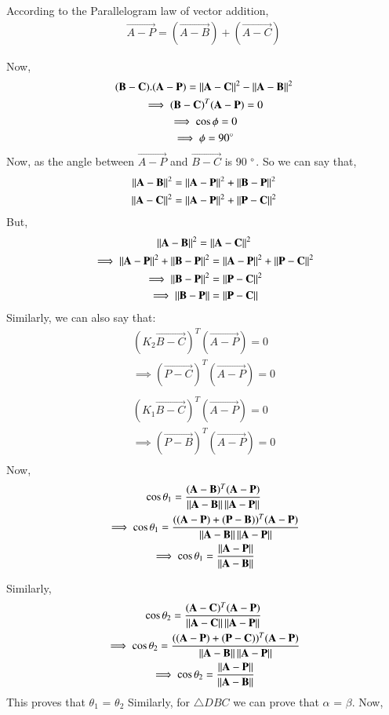 \documentclass[journal,12pt,twocolumn]{IEEEtran}
\begin{document}
According to the Parallelogram law of vector addition,
\begin{align}
\vec{A-P} = (\vec{A-B}) + (\vec{A-C})
\end{align}

Now, 
\begin{multline}
(\mathbf{B-C}). (\mathbf{A-P}) = \left\lVert\mathbf{A-C}\right\rVert^2 - \left\lVert\mathbf{A-B}\right\rVert^2\\
\implies (\mathbf{B-C})^T (\mathbf{A-P}) = 0\\
\implies \cos\phi = 0\\
\implies \phi = 90 \degree
\end{multline}
Now, as the angle between $\vec{A-P}$ and $\vec{B-C}$ is 90 $\degree$. So we can say that,
\begin{multline}
\left\lVert\mathbf{A-B}\right\rVert^2 = \left\lVert\mathbf{A-P}\right\rVert^2 + \left\lVert\mathbf{B-P}\right\rVert^2\\
\left\lVert\mathbf{A-C}\right\rVert^2 = \left\lVert\mathbf{A-P}\right\rVert^2 + \left\lVert\mathbf{P-C}\right\rVert^2\\
\end{multline}
But,
\begin{multline}
\left\lVert\mathbf{A-B}\right\rVert^2 = \left\lVert\mathbf{A-C}\right\rVert^2\\
\implies \left\lVert\mathbf{A-P}\right\rVert^2 + \left\lVert\mathbf{B-P}\right\rVert^2 = \left\lVert\mathbf{A-P}\right\rVert^2 + \left\lVert\mathbf{P-C}\right\rVert^2\\
\implies \left\lVert\mathbf{B-P}\right\rVert^2 = \left\lVert\mathbf{P-C}\right\rVert^2\\
\implies \left\lVert\mathbf{B-P}\right\rVert = \left\lVert\mathbf{P-C}\right\rVert
\end{multline}
Similarly, we can also say that:
\begin{multline}
(K_2 \vec{B-C})^T (\vec{A-P}) = 0\\
\implies (\vec{P-C})^T (\vec{A-P}) = 0\\
\end{multline}
\begin{multline}
(K_1 \vec{B-C})^T (\vec{A-P}) = 0\\
\implies (\vec{P-B})^T (\vec{A-P}) = 0\\
\end{multline}
Now,
\begin{multline}
\cos\theta_1 = \frac{(\mathbf{A-B})^T (\mathbf{A-P})}{\left\lVert\mathbf{A-B}\right\rVert\left\lVert\mathbf{A-P}\right\rVert}\\
\implies \cos\theta_1 = \frac{((\mathbf{A-P}) + (\mathbf{P-B}))^T(\mathbf{A-P})}{\left\lVert\mathbf{A-B}\right\rVert\left\lVert\mathbf{A-P}\right\rVert}\\
\implies \cos\theta_1 = \frac{\left\lVert\mathbf{A-P}\right\rVert}{\left\lVert\mathbf{A-B}\right\rVert} 
\end{multline}

Similarly,
\begin{multline}
\cos\theta_2 = \frac{(\mathbf{A-C})^T (\mathbf{A-P})}{\left\lVert\mathbf{A-C}\right\rVert\left\lVert\mathbf{A-P}\right\rVert}\\
\implies \cos\theta_2 = \frac{((\mathbf{A-P}) + (\mathbf{P-C}))^T(\mathbf{A-P})}{\left\lVert\mathbf{A-B}\right\rVert\left\lVert\mathbf{A-P}\right\rVert}\\
\implies \cos\theta_2 = \frac{\left\lVert\mathbf{A-P}\right\rVert}{\left\lVert\mathbf{A-B}\right\rVert}
\end{multline}
This proves that $\theta_1$ = $\theta_2$
Similarly, for $\triangle DBC$ we can prove that $\alpha$ = $\beta$.
Now, 
\end{document}
